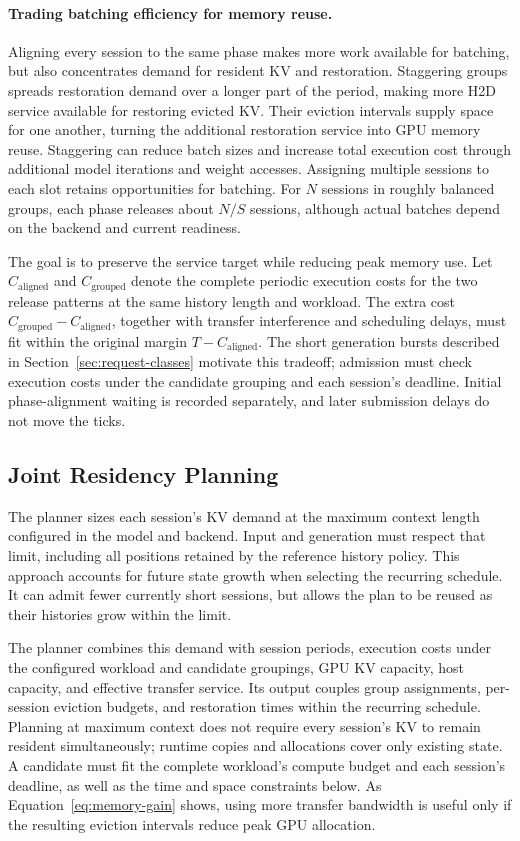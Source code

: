 \paragraph{Trading batching efficiency for memory reuse.}
Aligning every session to the same phase makes more work available for batching, but also concentrates demand for resident KV and restoration.
Staggering groups spreads restoration demand over a longer part of the period, making more H2D service available for restoring evicted KV.
Their eviction intervals supply space for one another, turning the additional restoration service into GPU memory reuse.
Staggering can reduce batch sizes and increase total execution cost through additional model iterations and weight accesses.
Assigning multiple sessions to each slot retains opportunities for batching.
For $N$ sessions in roughly balanced groups, each phase releases about $N/S$ sessions, although actual batches depend on the backend and current readiness.

The goal is to preserve the service target while reducing peak memory use.
Let $C_{\mathrm{aligned}}$ and $C_{\mathrm{grouped}}$ denote the complete periodic execution costs for the two release patterns at the same history length and workload.
The extra cost $C_{\mathrm{grouped}}-C_{\mathrm{aligned}}$, together with transfer interference and scheduling delays, must fit within the original margin $T-C_{\mathrm{aligned}}$.
The short generation bursts described in Section~\ref{sec:request-classes} motivate this tradeoff; admission must check execution costs under the candidate grouping and each session's deadline.
Initial phase-alignment waiting is recorded separately, and later submission delays do not move the ticks.

\subsection{Joint Residency Planning}
\label{sec:design-planning}

The planner sizes each session's KV demand at the maximum context length configured in the model and backend.
Input and generation must respect that limit, including all positions retained by the reference history policy.
This approach accounts for future state growth when selecting the recurring schedule.
It can admit fewer currently short sessions, but allows the plan to be reused as their histories grow within the limit.

The planner combines this demand with session periods, execution costs under the configured workload and candidate groupings, GPU KV capacity, host capacity, and effective transfer service.
Its output couples group assignments, per-session eviction budgets, and restoration times within the recurring schedule.
Planning at maximum context does not require every session's KV to remain resident simultaneously; runtime copies and allocations cover only existing state.
A candidate must fit the complete workload's compute budget and each session's deadline, as well as the time and space constraints below.
As Equation~\ref{eq:memory-gain} shows, using more transfer bandwidth is useful only if the resulting eviction intervals reduce peak GPU allocation.

